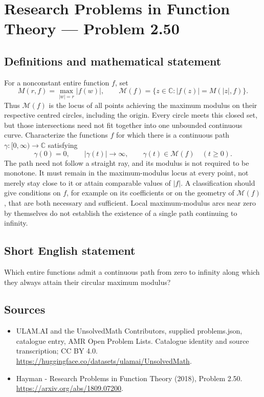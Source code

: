 \documentclass[11pt,a4paper]{article}
\begin{document}
\section*{Research Problems in Function Theory — Problem 2.50}\label{statement}

\subsection{Definitions and mathematical statement}
For a nonconstant entire function $f$, set
\[
M(r,f)=\max_{|w|=r}|f(w)|,
\qquad \mathcal M(f)=\{z\in\mathbb C:|f(z)|=M(|z|,f)\}.
\]
Thus $\mathcal M(f)$ is the locus of all points achieving the maximum modulus on their respective centred circles, including the origin. Every circle meets this closed set, but those intersections need not fit together into one unbounded continuous curve.
Characterize the functions $f$ for which there is a continuous path
$\gamma:[0,\infty)\to\mathbb C$ satisfying
\[
\gamma(0)=0,\qquad |\gamma(t)|\longrightarrow\infty,
\qquad\gamma(t)\in\mathcal M(f)\quad(t\ge0).
\]
The path need not follow a straight ray, and its modulus is not required to be monotone. It must remain in the maximum-modulus locus at every point, not merely stay close to it or attain comparable values of $|f|$. A classification should give conditions on $f$, for example on its coefficients or on the geometry of $\mathcal M(f)$, that are both necessary and sufficient. Local maximum-modulus arcs near zero by themselves do not establish the existence of a single path continuing to infinity.
\subsection{Short English statement}
Which entire functions admit a continuous path from zero to infinity along which they always attain their circular maximum modulus?
\subsection{Sources}
\begin{itemize}
\item[S1] ULAM.AI and the UnsolvedMath Contributors, supplied problems.json, catalogue entry, AMR Open Problem Lists. Catalogue identity and source transcription; CC BY 4.0.
\url{https://huggingface.co/datasets/ulamai/UnsolvedMath}.
\item[S2] Hayman - Research Problems in Function Theory (2018), Problem 2.50. 
\url{https://arxiv.org/abs/1809.07200}.
\end{itemize}
\end{document}
